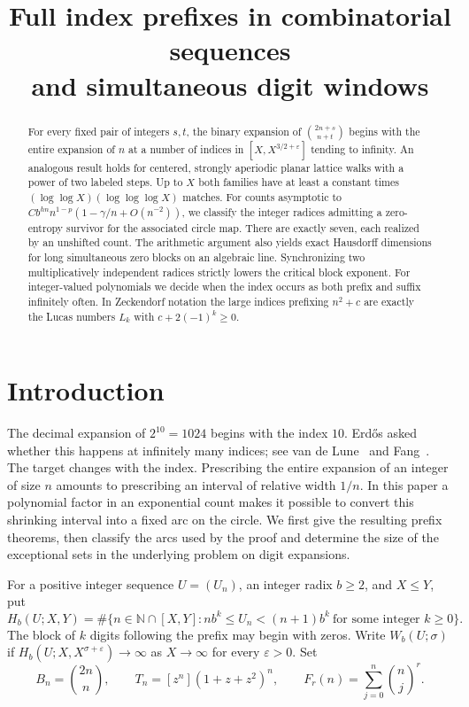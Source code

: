 \documentclass[11pt,reqno,a4paper]{amsart}
\title[Full index prefixes and digit windows]{Full index prefixes in combinatorial sequences\\ and simultaneous digit windows}
\date{}
\theoremstyle{remark}
\begin{document}
\begin{abstract}
For every fixed pair of integers \(s,t\), the binary expansion of
\(\binom{2n+s}{n+t}\) begins with the entire expansion of \(n\) at a number
of indices in \([X,X^{3/2+\varepsilon}]\) tending to infinity. An
analogous result holds for centered, strongly aperiodic planar lattice
walks with a power of two labeled steps. Up to \(X\) both families have
at least a constant times \((\log\log X)(\log\log\log X)\) matches.
For counts asymptotic to
\(Cb^{hn}n^{1-p}(1-\gamma/n+O(n^{-2}))\), we classify the integer
radices admitting a zero-entropy survivor for the associated circle
map. There are exactly seven, each realized by an unshifted count.
The arithmetic argument also yields exact Hausdorff dimensions for long
simultaneous zero blocks on an algebraic line. Synchronizing two
multiplicatively independent radices strictly lowers the critical block
exponent. For integer-valued polynomials we decide when the index occurs
as both prefix and suffix infinitely often. In Zeckendorf notation the
large indices prefixing \(n^2+c\) are exactly the Lucas numbers \(L_k\)
with \(c+2(-1)^k\ge0\).
\end{abstract}
\maketitle

\section{Introduction}

The decimal expansion of \(2^{10}=1024\) begins with the index \(10\).
Erd\H{o}s asked whether this happens at infinitely many indices; see
van de Lune~\cite{vdl} and Fang~\cite{fang}. The target changes with
the index. Prescribing the entire expansion of an integer of size \(n\)
amounts to prescribing an interval of relative width \(1/n\).
In this paper a polynomial factor in an exponential count makes it
possible to convert this shrinking interval into a fixed arc on the
circle. We first give the resulting prefix theorems, then classify the
arcs used by the proof and determine the size of the exceptional sets
in the underlying problem on digit expansions.

For a positive integer sequence \(U=(U_n)\), an integer radix \(b\ge2\),
and \(X\le Y\), put
\[
 H_b(U;X,Y)=\#\{n\in\mathbb N\cap[X,Y]:
             nb^k\le U_n<(n+1)b^k\ \text{for some integer }k\ge0\}.
\]
The block of \(k\) digits following the prefix may begin with zeros. Write \(W_b(U;\sigma)\) if
\(H_b(U;X,X^{\sigma+\varepsilon})\to\infty\) as \(X\to\infty\)
for every \(\varepsilon>0\). Set
\[
 B_n=\binom{2n}{n},\qquad
 T_n=[z^n](1+z+z^2)^n,\qquad F_r(n)=\sum_{j=0}^n\binom nj^r.
\]
\end{document}

